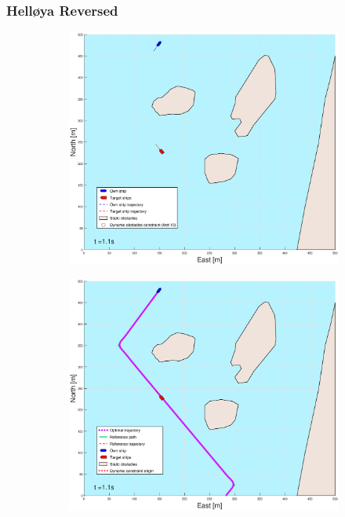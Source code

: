 \subsubsection{Helløya Reversed}
\clearpage
\begin{figure}[!b] %
    \begin{subfigure}[b]{0.49\textwidth}
        \centering
        \includegraphics[width=\textwidth]{Images/Figures/Helloya_Rev/_Simple_0fig1_time=1}
    \end{subfigure}
    \hfill
    \begin{subfigure}[b]{0.499\textwidth}
        \centering
        \includegraphics[width=\textwidth]{Images/Figures/Helloya_Rev/_Simple_0fig999_time=1}

\end{subfigure}
\end{figure}
